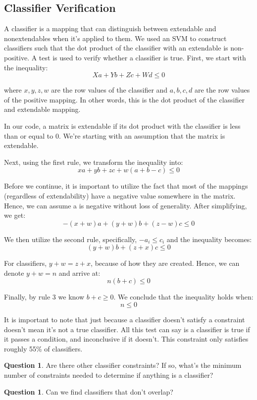 \documentclass[11pt]{amsart}
\theoremstyle{definition}
\newtheorem{question}[thm]{Question}
\begin{document}
\subsection{Classifier Verification}

A classifier is a mapping that can distinguish between extendable and nonextendables when it's applied to them. We used an SVM to construct classifiers such that the dot product of the classifier with an extendable is non-positive. A test is used to verify whether a classifier is true. First, we start with the inequality:
\[
Xa + Yb + Zc + Wd \leq 0
\]

where \(x,y,z, w\) are the row values of the classifier and \(a,b,c, d\) are the row values of the positive mapping. In other words, this is the dot product of the classifier and extendable mapping. 

In our code, a matrix is extendable if its dot product with the classifier is less than or equal to 0. We're starting with an assumption that the matrix is extendable.

Next, using the first rule, we transform the inequality into:
\[
xa + yb + zc + w(a + b - c) \leq 0
\]

Before we continue, it is important to utilize the fact that most of the mappings (regardless of extendability) have a negative value somewhere in the matrix. Hence, we can assume a is negative without loss of generality. After simplifying, we get:
\[
-(x + w)a + (y + w)b + (z - w)c \leq 0
\]

We then utilize the second rule, specifically, \(-a_i \leq c_i\) and the inequality becomes:
\[
(y + w)b + (z + x)c \leq 0
\]

For classifiers, \(y + w = z + x\), because of how they are created. Hence, we can denote \(y + w = n\) and arrive at:
\[
n(b + c) \leq 0
\]

Finally, by rule 3 we know \(b + c \geq 0\). We conclude that the inequality holds when:
\[
n \leq 0
\]

It is important to note that just because a classifier doesn't satisfy a constraint doesn't mean it's not a true classifier. All this test can say is a classifier is true if it passes a condition, and inconclusive if it doesn't. This constraint only satisfies roughly 55\% of classifiers.

\begin{question}
    Are there other classifier constraints? If so, what's the minimum number of constraints needed to determine if anything is a classifier?
\end{question}
\begin{question}
    Can we find classifiers that don't overlap?
\end{question}
\end{document}
